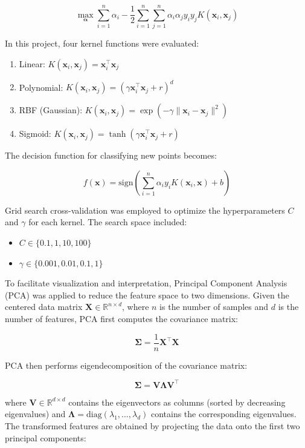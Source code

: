 \documentclass{article}
\begin{document}
\[
\max_{\boldsymbol{\alpha}} \sum_{i=1}^n \alpha_i - \frac{1}{2}\sum_{i=1}^n\sum_{j=1}^n \alpha_i\alpha_j y_i y_j K(\mathbf{x}_i, \mathbf{x}_j)
\]

In this project, four kernel functions were evaluated:
\begin{enumerate}
    \item Linear: $K(\mathbf{x}_i, \mathbf{x}_j) = \mathbf{x}_i^\top\mathbf{x}_j$
    \item Polynomial: $K(\mathbf{x}_i, \mathbf{x}_j) = (\gamma\mathbf{x}_i^\top\mathbf{x}_j + r)^d$
    \item RBF (Gaussian): $K(\mathbf{x}_i, \mathbf{x}_j) = \exp(-\gamma\|\mathbf{x}_i - \mathbf{x}_j\|^2)$
    \item Sigmoid: $K(\mathbf{x}_i, \mathbf{x}_j) = \tanh(\gamma\mathbf{x}_i^\top\mathbf{x}_j + r)$
\end{enumerate}

The decision function for classifying new points becomes:

\[
f(\mathbf{x}) = \text{sign}\left(\sum_{i=1}^n \alpha_i y_i K(\mathbf{x}_i, \mathbf{x}) + b\right)
\]

Grid search cross-validation was employed to optimize the hyperparameters $C$ and $\gamma$ for each kernel. The search space included:
\begin{itemize}
    \item $C \in \{0.1, 1, 10, 100\}$
    \item $\gamma \in \{0.001, 0.01, 0.1, 1\}$
\end{itemize}

To facilitate visualization and interpretation, Principal Component Analysis (PCA) was applied to reduce the feature space to two dimensions. Given the centered data matrix $\mathbf{X} \in \mathbb{R}^{n \times d}$, where $n$ is the number of samples and $d$ is the number of features, PCA first computes the covariance matrix:

\[
\mathbf{\Sigma} = \frac{1}{n}\mathbf{X}^\top\mathbf{X}
\]

PCA then performs eigendecomposition of the covariance matrix:

\[
\mathbf{\Sigma} = \mathbf{V}\boldsymbol{\Lambda}\mathbf{V}^\top
\]

where $\mathbf{V} \in \mathbb{R}^{d \times d}$ contains the eigenvectors as columns (sorted by decreasing eigenvalues) and $\boldsymbol{\Lambda} = \text{diag}(\lambda_1, \ldots, \lambda_d)$ contains the corresponding eigenvalues. The transformed features are obtained by projecting the data onto the first two principal components:
\end{document}
